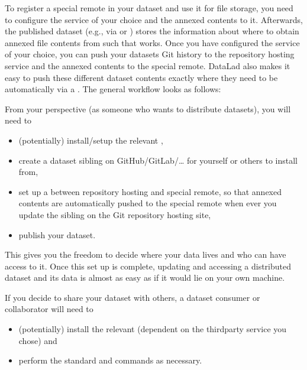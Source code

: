 \sphinxAtStartPar
To register a special remote in your dataset and use it for file storage, you need to configure the service of your choice and  the annexed contents to it. Afterwards, the published dataset (e.g., via {\hyperref[\detokenize{glossary:term-GitHub}]{}} or {\hyperref[\detokenize{glossary:term-GitLab}]{}}) stores the information about where to obtain annexed file contents from such that
 works.
Once you have configured the service of your choice, you can push your datasets Git history to the repository hosting service and the annexed contents to the special remote. DataLad also makes it easy to push these different dataset contents exactly where they need to be automatically via a {\hyperref[\detokenize{glossary:term-publication-dependency}]{}}.
The general workflow looks as follows:

\sphinxAtStartPar
From your perspective (as someone who wants to distribute datasets), you will
need to
\begin{itemize}
\item {} 
\sphinxAtStartPar
(potentially) install/setup the relevant ,

\item {} 
\sphinxAtStartPar
create a dataset sibling on GitHub/GitLab/… for yourself or others to install from,

\item {} 
\sphinxAtStartPar
set up a  between repository hosting and special remote, so that annexed contents are automatically pushed to the special remote when ever you update the sibling on the Git repository hosting site,

\item {} 
\sphinxAtStartPar
publish your dataset.

\end{itemize}

\sphinxAtStartPar
This gives you the freedom to decide where your data lives and
who can have access to it. Once this set up is complete, updating and
accessing a distributed dataset and its data is almost as easy as if it would
lie on your own machine.

\sphinxAtStartPar
If you decide to share your dataset with others, a dataset consumer or collaborator will need to
\begin{itemize}
\item {} 
\sphinxAtStartPar
(potentially) install the relevant  (dependent on the third\sphinxhyphen{}party service you chose) and

\item {} 
\sphinxAtStartPar
perform the standard  and  commands
as necessary.

\end{itemize}

